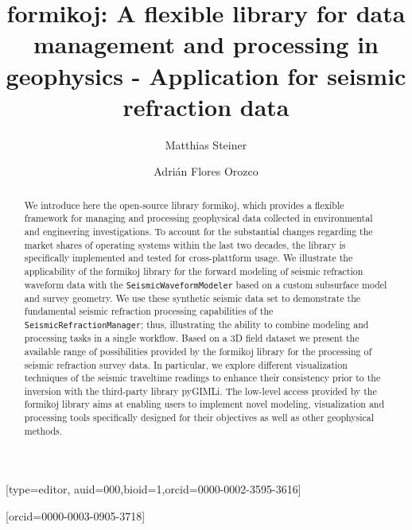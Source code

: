 \documentclass[a4paper,fleqn]{cas-sc}
\begin{document}
\let\WriteBookmarks\relax
\def\floatpagepagefraction{1}
\def\textpagefraction{.001}

\title [mode = title]{formikoj: A flexible library for data management and processing in geophysics - Application for seismic refraction data}


\author[1]{Matthias Steiner}[type=editor,
                        auid=000,bioid=1,orcid=0000-0002-3595-3616]
\cormark[1]

\author[1]{Adrián {Flores Orozco}}[orcid=0000-0003-0905-3718] 

\address[1]{Research Unit of Geophysics, Department of Geodesy and Geoinformation, TU Wien}

\begin{abstract}
We introduce here the open-source library formikoj, which provides a flexible framework for managing and processing geophysical data collected in environmental and engineering investigations. To account for the substantial changes regarding the market shares of operating systems within the last two decades, the library is specifically implemented and tested for cross-plattform usage.
We illustrate the applicability of the formikoj library for the forward modeling of seismic refraction waveform data with the \texttt{SeismicWaveformModeler} based on a custom subsurface model and survey geometry. We use these synthetic seismic data set to demonstrate the fundamental seismic refraction processing capabilities of the \texttt{SeismicRefractionManager}; thus, illustrating the ability to combine modeling and processing tasks in a single workflow.
Based on a 3D field dataset we present the available range of possibilities provided by the formikoj library for the processing of seismic refraction survey data. In particular, we explore different visualization techniques of the seismic traveltime readings to enhance their consistency prior to the inversion with the third-party library pyGIMLi. 
The low-level access provided by the formikoj library aims at enabling users to implement novel modeling, visualization and processing tools specifically designed for their objectives as well as other geophysical methods.
\end{abstract}
 
\end{document}
